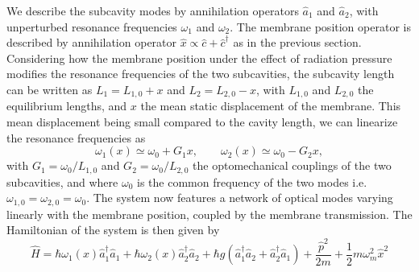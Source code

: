 We describe the subcavity modes by annihilation operators \( \hat a_1\) and \(\hat a_2\), with unperturbed resonance frequencies \(\omega_1\) and \(\omega_2\). The membrane position operator is described by annihilation operator $\hat x \propto \hat c + \hat c^{\dagger} $ as in the previous section. Considering how the membrane position under the effect of radiation pressure modifies the resonance frequencies of the two subcavities, the subcavity length can be written as \(L_1 = L_{1,0} +  x\) and \(L_2 = L_{2,0} -  x\), with \(L_{1,0}\) and \(L_{2,0}\) the equilibrium lengths, and $x$ the mean static displacement of the membrane. This mean displacement being small compared to the cavity length, we can linearize the resonance frequencies as
\begin{equation}
\omega_1(x) \simeq \omega_{0} + G_1 x, \qquad \omega_2(x) \simeq \omega_{0} - G_2 x,
\end{equation}
with \(G_1 = \omega_{0}/L_{1,0}\) and \(G_2 = \omega_{0}/L_{2,0}\) the optomechanical couplings of the two subcavities, and where \(\omega_{0}\) is the common frequency of the two modes i.e. \(\omega_{1,0} = \omega_{2,0} = \omega_{0}\). The system now features a network of optical modes varying linearly with the membrane position, coupled by the membrane transmission. The Hamiltonian of the system is then given by \cite{xu_cavity_2016}
\begin{equation}
\hat{H} = \hbar \omega_1(x) \hat a_1^\dagger \hat{a}_1 + \hbar \omega_2(x) \hat{a}_2^\dagger \hat{a}_2 + \hbar g(\hat{a}_1^\dagger \hat{a}_2 + \hat{a}_2^\dagger \hat{a}_1) + \frac{\hat{p}^2}{2m} + \frac{1}{2} m \omega_m^2 \hat{x}^2
\end{equation}



